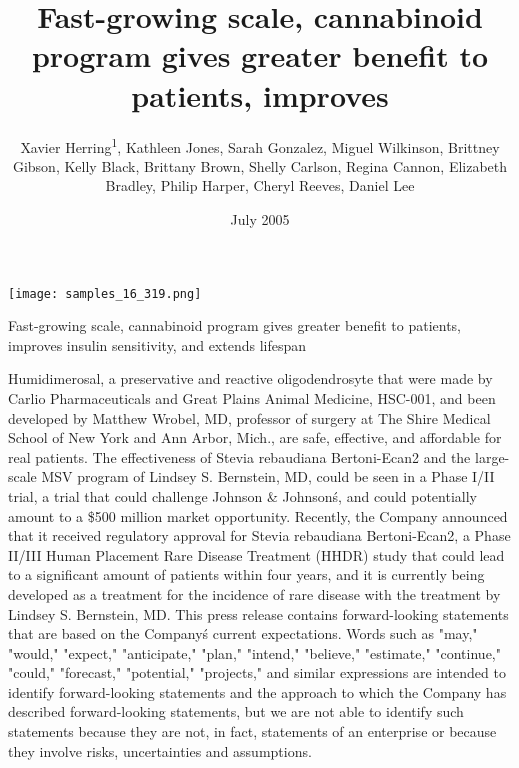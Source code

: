 \documentclass{article}
\title{Fast-growing scale, cannabinoid program gives greater benefit to patients, improves}
\author{Xavier Herring\textsuperscript{1},  Kathleen Jones,  Sarah Gonzalez,  Miguel Wilkinson,  Brittney Gibson,  Kelly Black,  Brittany Brown,  Shelly Carlson,  Regina Cannon,  Elizabeth Bradley,  Philip Harper,  Cheryl Reeves,  Daniel Lee}
\affil{\textsuperscript{1}Bhabha Atomic Research Centre}
\date{July 2005}
\begin{document}
\maketitle

\begin{center}
\begin{minipage}{0.75\linewidth}
\texttt{[image: samples\_16\_319.png]}
\end{minipage}
\end{center}

Fast-growing scale, cannabinoid program gives greater benefit to patients, improves insulin sensitivity, and extends lifespan

Humidimerosal, a preservative and reactive oligodendrosyte that were made by Carlio Pharmaceuticals and Great Plains Animal Medicine, HSC-001, and been developed by Matthew Wrobel, MD, professor of surgery at The Shire Medical School of New York and Ann Arbor, Mich., are safe, effective, and affordable for real patients. The effectiveness of Stevia rebaudiana Bertoni-Ecan2 and the large-scale MSV program of Lindsey S. Bernstein, MD, could be seen in a Phase I/II trial, a trial that could challenge Johnson \& Johnson\'s, and could potentially amount to a \$500 million market opportunity. Recently, the Company announced that it received regulatory approval for Stevia rebaudiana Bertoni-Ecan2, a Phase II/III Human Placement Rare Disease Treatment (HHDR) study that could lead to a significant amount of patients within four years, and it is currently being developed as a treatment for the incidence of rare disease with the treatment by Lindsey S. Bernstein, MD. This press release contains forward-looking statements that are based on the Company\'s current expectations. Words such as "may," "would," "expect," "anticipate," "plan," "intend," "believe," "estimate," "continue," "could," "forecast," "potential," "projects," and similar expressions are intended to identify forward-looking statements and the approach to which the Company has described forward-looking statements, but we are not able to identify such statements because they are not, in fact, statements of an enterprise or because they involve risks, uncertainties and assumptions.
\end{document}

